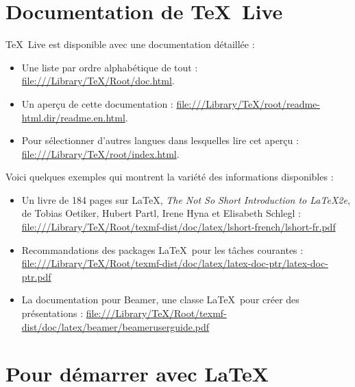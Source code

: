 \documentclass[11pt, oneside]{article}
\begin{document}
\pagestyle{empty}

\section{Documentation de \TeX\ Live}

\TeX\ Live est disponible avec une documentation détaillée :

\begin{itemize}
\item Une liste par ordre alphabétique de tout :
\url{file:///Library/TeX/Root/doc.html}.

\item Un aperçu de cette documentation :
\url{file:///Library/TeX/root/readme-html.dir/readme.en.html}.

\item Pour sélectionner d'autres langues dans lesquelles lire cet aperçu :
\url{file:///Library/TeX/root/index.html}.
\end{itemize}


Voici quelques exemples qui montrent la variété des informations disponibles :

\begin{itemize}

\item Un livre de 184 pages sur \LaTeX, \emph {The Not So Short Introduction to \LaTeX 2e}, de Tobias Oetiker, Hubert Partl, Irene Hyna et Elisabeth Schlegl : 
     \url{file:///Library/TeX/Root/texmf-dist/doc/latex/lshort-french/lshort-fr.pdf}
     
\item Recommandations des packages \LaTeX\ pour les tâches courantes : \url{file:///Library/TeX/Root/texmf-dist/doc/latex/latex-doc-ptr/latex-doc-ptr.pdf}

\item La documentation pour Beamer, une classe \LaTeX\ pour créer des présentations :
\url{file:///Library/TeX/Root/texmf-dist/doc/latex/beamer/beameruserguide.pdf}

\end{itemize}

\section{Pour démarrer avec \LaTeX}
\end{document}
